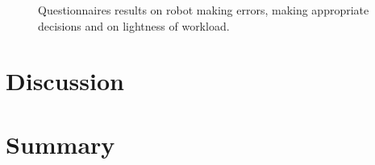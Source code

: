 \begin{figure}[ht]
\begin{subfigure}[t]{0.3295\textwidth}
	\end{subfigure}
	\caption{Questionnaires results on robot making errors, making appropriate decisions and on lightness of workload.}
	\label{fig:woz_quest}
\end{figure}

\section{Discussion}

\section{Summary}

